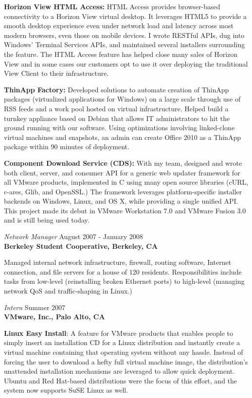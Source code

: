 \documentclass[overlapped,line,margin]{res}
\begin{document}
\begin{resume}
  \textbf{Horizon View HTML Access:} HTML Access provides browser-based
  connectivity to a Horizon View virtual desktop. It leverages HTML5 to provide
  a smooth desktop experience even under network load and latency across most
  modern browsers, even those on mobile devices. I wrote RESTful APIs, dug into
  Windows' Terminal Services APIs, and maintained several installers
  surrounding the feature. The HTML Access feature has helped close many sales
  of Horizon View and in some cases our customers opt to use it over deploying
  the traditional View Client to their infrastructure.

  \textbf{ThinApp Factory:} Developed solutions to automate creation of
  ThinApp packages (virtualized applications for Windows) on a large scale
  through use of RSS feeds and a work pool hosted on virtual infrastructure.
  Helped build a turnkey appliance based on Debian that allows IT
  administrators to hit the ground running with our software. Using
  optimizations involving linked-clone virtual machines and snapshots, an admin
  can create Office 2010 as a ThinApp package within 90 minutes of deployment.

  \textbf{Component Download Service (CDS):} With my team, designed and wrote
  both client, server, and consumer API for a generic web updater framework for
  all VMware products, implemented in C using many open source libraries (cURL,
  c-ares, Glib, and OpenSSL.) The framework leverages platform-specific
  installer backends on Windows, Linux, and OS X, while providing a single
  unified API. This project made its debut in VMware Workstation 7.0 and VMware
  Fusion 3.0 and is still being used today.

{\sl Network Manager} \hfill August 2007 - January 2008 \\
\textbf{Berkeley Student Cooperative, Berkeley, CA}

  Managed internal network infrastructure, firewall, routing
  software, Internet connection, and file servers for a house of 120 residents.
  Responsibilities include tasks from low-level (reinstalling broken Ethernet
  ports) to high-level (managing network QoS and traffic-shaping in Linux.)

{\sl Intern} \hfill Summer 2007 \\
\textbf{VMware, Inc., Palo Alto, CA}

  \textbf{Linux Easy Install}: A feature for VMware products that enables people
  to simply insert an installation CD for a Linux distribution and instantly
  create a virtual machine containing that operating system without any hassle.
  Instead of forcing the user to download a hefty full virtual machine image,
  the distribution's unattended installation mechanisms are leveraged to allow
  quick deployment. Ubuntu and Red Hat-based distributions were the focus of
  this effort, and the system now supports SuSE Linux as well.


\end{resume}
\end{document}

